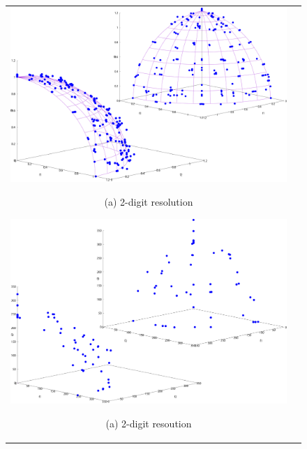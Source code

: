 \documentclass[../main/main]{subfiles}
\begin{document}
\begin{figure}[htbp]
\begin{tabular}{cc}
\begin{minipage}{0.32\hsize}
\includegraphics[width=1\linewidth]{../figures/MOEAD/DTLZ2_another_digi2_double.pdf}
\begin{center}
{\footnotesize (a) 2-digit resolution}
\end{center}
\end{minipage}
\begin{minipage}{0.32\hsize}
\includegraphics[width=1\linewidth]{../figures/MOEAD/DTLZ3_another_digi2_double.pdf}
\begin{center}
{\footnotesize (a) 2-digit resoution}
\end{center}
\end{minipage}
\begin{minipage}{0.32\hsize}

\end{minipage}
\end{tabular}
\end{figure}
\end{document}
